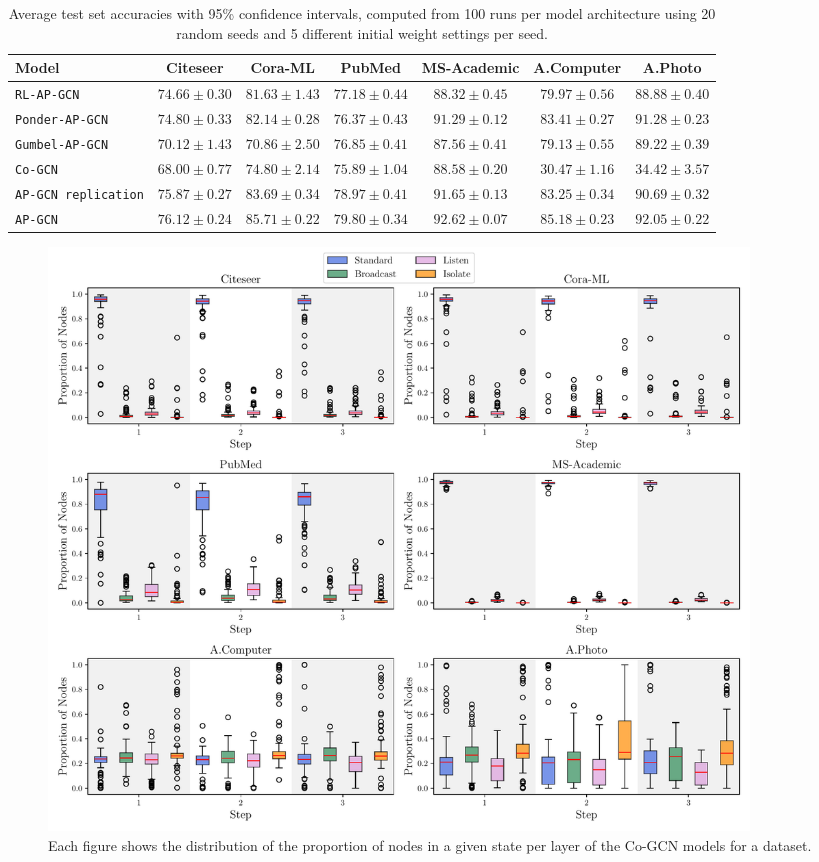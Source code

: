\documentclass{gdl}
\begin{document}
\newpage
\onecolumn

\begin{table}[h]
    \small\sf\centering
    \caption{Average test set accuracies with 95\% confidence intervals, computed from 100 runs per model architecture using 20 random seeds and 5 different initial weight settings per seed.}
    \begin{tabular}{l c c c c c c}
        \toprule
        Model & Citeseer & Cora-ML & PubMed & MS-Academic & A.Computer & A.Photo\\
        \midrule
        \texttt{RL-AP-GCN} &$74.66 \pm 0.30$&$81.63 \pm 1.43$&$77.18 \pm 0.44$&$88.32 \pm 0.45$&$79.97 \pm 0.56$&$88.88 \pm 0.40$   \\
        \texttt{Ponder-AP-GCN} &$74.80 \pm 0.33$&$82.14 \pm 0.28$&$76.37 \pm 0.43$&$91.29 \pm 0.12$&$83.41 \pm 0.27$&$91.28 \pm 0.23$  \\
        \texttt{Gumbel-AP-GCN} &$70.12 \pm 1.43$&$70.86 \pm 2.50$&$76.85 \pm 0.41$&$87.56 \pm 0.41$&$79.13 \pm 0.55$&$89.22 \pm 0.39$  \\
        \texttt{Co-GCN} &$68.00 \pm 0.77$&$74.80 \pm 2.14$&$75.89 \pm 1.04$&$88.58 \pm 0.20$&$30.47 \pm 1.16$&$34.42 \pm 3.57$  \\
        \texttt{AP-GCN replication} &$75.87 \pm 0.27$&$83.69 \pm 0.34$&$78.97 \pm 0.41$&$91.65 \pm 0.13$&$83.25 \pm 0.34$&$90.69 \pm 0.32$        \\
        \midrule
        \texttt{AP-GCN} & $76.12 \pm 0.24$ & $85.71 \pm 0.22$ & $79.80 \pm 0.34$ & $92.62 \pm 0.07$ & $85.18 \pm 0.23$ & $92.05 \pm 0.22$\\
        \bottomrule
    \end{tabular}
    \label{tab:accuracy}
\end{table}

\begin{figure}[h]
    \centering 
        \includegraphics[width=0.9\textwidth]{Cooperative-AP-GCN_state_distribution_per_step.pdf}
        \caption{Each figure shows the distribution of the proportion of nodes in a given state per layer of the Co-GCN models for a dataset.}
        \label{fig:cooperative-result} 
\end{figure}
\end{document}
